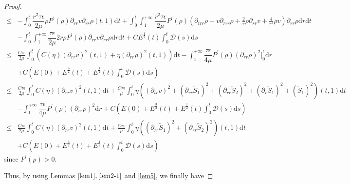 \documentclass[10pt,reqno]{amsart}
\numberwithin{equation}{section}
\begin{document}
\begin{proof}
\begin{equation}
\begin{aligned}
				\leq&-\int_{0}^{t}\dfrac{r^2\tau\epsilon}{2\mu}\rho P^{\prime}(\rho)\partial_{rr}v\partial_{rr}\rho(t,1)\mathrm{d}t
				+\int_{0}^{t}\int_{1}^{+\infty}\dfrac{r^2\tau\epsilon}{2\mu}P^{\prime}(\rho)(\partial_{trr} \rho+v\partial_{rrr}\rho+\frac{2}{r}\rho\partial_{rr}v+\frac{4}{r^3}\rho v)\partial_{rr}\rho\mathrm{d}r\mathrm{d}t\\
				&-
				\int_{0}^{t}\int_{1}^{+\infty}\dfrac{\tau\epsilon}{2\mu}2r\rho P^{\prime}(\rho)\partial_{rr}v\partial_{rr}\rho \mathrm{d}r\mathrm{d}t
				+ CE^{\frac{1}{2}}(t) \int_{0}^{t}\mathcal{D}(s)\mathrm{d}s
				\\
				\leq& \frac{C\tau\epsilon}{2\mu}\int_{0}^{t}\left(C(\eta)(\partial_{rr}v)^2(t,1)+\eta(\partial_{rr}\rho)^2(t,1)\right)\mathrm{d}t
				-\int_{1}^{+\infty}\dfrac{\tau\epsilon}{4\mu}P^{\prime}(\rho)(\partial_{rr}\rho)^2\big|_0^t\mathrm{d}r\\
				&
				+ C\left(E(0)+E^{\frac{3}{2}}(t) +E^{\frac{1}{2}}(t) \int_{0}^{t}\mathcal{D}(s)\mathrm{d}s\right)\\
				\leq& \frac{C\tau\epsilon}{2\mu}\int_{0}^{t}C(\eta)(\partial_{rr}v)^2(t,1)\mathrm{d}t
				+\frac{C\tau\epsilon}{\mu}\int_{0}^{t}\eta\left(
				(\partial_{tr}v)^2+(\partial_{rr} \tilde{S}_1)^2+(\partial_{rr} \tilde{S}_2)^2+(\partial_{r} \tilde{S}_1)^2+(\tilde{S}_1)^2\right)(t,1)\mathrm{d}t\\
				&-\int_{1}^{+\infty}\dfrac{\tau\epsilon}{4\mu}P^{\prime}(\rho)(\partial_{rr}\rho)^2\mathrm{d}r
				+ C\left(E(0)+E^{\frac{3}{2}}(t) +E^{\frac{1}{2}}(t) \int_{0}^{t}\mathcal{D}(s)\mathrm{d}s\right)\\
				\leq&
				\frac{C\tau\epsilon}{2\mu}\int_{0}^{t}C(\eta)(\partial_{rr}v)^2(t,1)\mathrm{d}t
				+\frac{C\tau\epsilon}{\mu}\int_{0}^{t}\eta\left(
				(\partial_{rr} \tilde{S}_1)^2+(\partial_{rr} \tilde{S}_2)^2\right)(t,1)\mathrm{d}t\\
				&
				+ C\left(E(0)+E^{\frac{3}{2}}(t) +E^{\frac{1}{2}}(t) \int_{0}^{t}\mathcal{D}(s)\mathrm{d}s\right)
			\end{aligned}
		\end{equation}
		since $P^{\prime}(\rho)>0$.
	
		Thus, 
		by using Lemmas $\ref{lem1}, \ref{lem2-1}$ and \ref{lem5}, we finally have
		

\end{proof}
\end{document}
